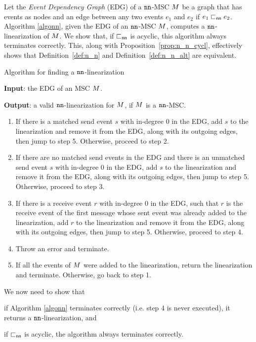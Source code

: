 Let the \emph{Event Dependency Graph} (EDG) of a $\mathtt{nn}$-MSC $M$ be a graph that has events as nodes and an edge between any two events $e_1$ and $e_2$ if $e_1 \sqsubset_{\mathsf{nn}} e_2$. Algorithm  \ref {algonn}, given the EDG of an $\mathtt{nn}$-MSC $M$, computes a $\mathtt{nn}$-linearization of $M$. We  show that, if $\sqsubset_{\mathsf{nn}}$ is acyclic, this algorithm always terminates correctly. This, along with Proposition~\ref{prop:n_n_cycl}, effectively shows that Definition~\ref{def:n_n} and Definition~\ref{def:n_n_alt} are equivalent.

\begin{algorithm}[t]
\caption{Algorithm for finding a $\mathtt{nn}$-linearization}
\label{algonn}
\raggedright \textbf{Input}: the EDG of an MSC $M$. \\
\raggedright \textbf{Output}: a valid $\mathtt{nn}$-linearization for $M$, if $M$ is a $\mathtt{nn}$-MSC.
\begin{enumerate}
	\item If there is a matched send event $s$ with in-degree 0 in the EDG, add $s$ to the linearization and remove it from the EDG, along with its outgoing edges, then jump to step 5. Otherwise, proceed to step 2.
	\item If there are no matched send events in the EDG and there is an unmatched send event $s$ with in-degree 0 in the EDG, add $s$ to the linearization and remove it from the EDG, along with its outgoing edges, then jump to step 5. Otherwise, proceed to step 3.
		\item If there is a receive event $r$ with in-degree 0 in the EDG, such that $r$ is the receive event of the first message whose sent event was already added to the linearization, add $r$ to the linearization and remove it from the EDG, along with its outgoing edges, then jump to step 5. Otherwise, proceed to step 4.
		\item Throw an error and terminate.
		\item If all the events of $M$ were added to the linearization, return the linearization and terminate. Otherwise, go back to step 1.
\end{enumerate} 
\end{algorithm}



We now need to show that 
\begin{enumerate*}[label={(\roman*)}]
	\item if Algorithm \ref{algonn} terminates correctly (i.e. step 4 is never executed), it returns a $\mathtt{nn}$-linearization, and 
	\item if $\sqsubset_{\mathsf{nn}}$ is acyclic, the algorithm always terminates correctly.
\end{enumerate*}

